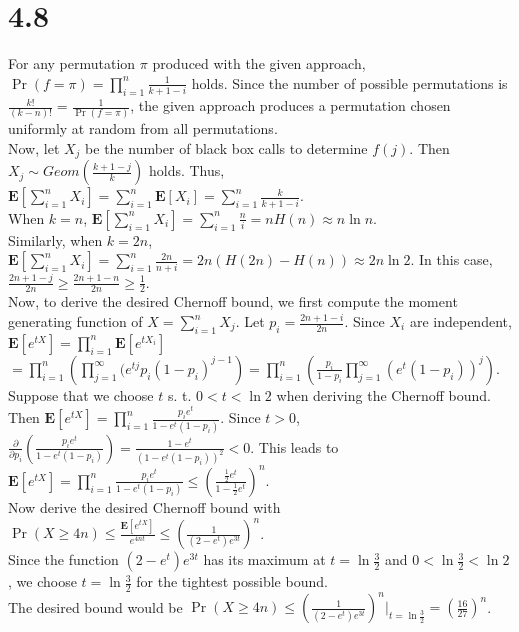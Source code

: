 \documentclass{article}
\begin{document}
\section*{4.8}
For any permutation $\pi$ produced with the given approach, $\Pr(f=\pi)=\prod\limits_{i=1}^n\frac{1}{k+1-i}$ holds.
Since the number of possible permutations is $\frac{k!}{(k-n)!}=\frac{1}{\Pr(f=\pi)}$,
the given approach produces a permutation chosen uniformly at random from all permutations.\\
Now, let $X_j$ be the number of black box calls to determine $f(j)$. Then $X_j\sim Geom(\frac{k+1-j}{k})$ holds.
Thus, $\textbf{E}[\sum\limits_{i=1}^nX_i]=\sum\limits_{i=1}^n\textbf{E}[X_i]=\sum\limits_{i=1}^n\frac{k}{k+1-i}$.\\
When $k=n$, $\textbf{E}[\sum\limits_{i=1}^nX_i]=\sum\limits_{i=1}^n\frac{n}{i}=nH(n)\approx n \ln n$.\\
Similarly, when $k=2n$, $\textbf{E}[\sum\limits_{i=1}^nX_i]=\sum\limits_{i=1}^n\frac{2n}{n+i}=2n(H(2n)-H(n))\approx2n\ln2$. In this case, $\frac{2n+1-j}{2n}\geq\frac{2n+1-n}{2n}\geq\frac{1}{2}$.\\
Now, to derive the desired Chernoff bound, we first compute the moment generating function of $X=\sum\limits_{i=1}^nX_j$.
Let $p_i=\frac{2n+1-i}{2n}$. Since $X_i$ are independent, $\textbf{E}[e^{tX}]=\prod\limits_{i=1}^n\textbf{E}[e^{tX_i}]$
$=\prod\limits_{i=1}^n\left(\prod\limits_{j=1}^\infty(e^{tj}p_i(1-p_i)^{j-1}\right)=\prod\limits_{i=1}^n\left(\frac{p_i}{1-p_i}\prod\limits_{j=1}^\infty(e^t(1-p_i))^j\right)$.\\
Suppose that we choose $t$ s. t. $0<t<\ln2$ when deriving the Chernoff bound.\\ Then $\textbf{E}[e^{tX}]=\prod\limits_{i=1}^n\frac{p_ie^t}{1-e^t(1-p_i)}$.
Since $t>0$, $\frac{\partial}{\partial p_i}\left(\frac{p_ie^t}{1-e^t(1-p_i)}\right)=\frac{1-e^t}{(1-e^t(1-p_i))^2}<0$.
This leads to $\textbf{E}[e^{tX}]=\prod\limits_{i=1}^n\frac{p_ie^t}{1-e^t(1-p_i)}\leq \left(\frac{\frac{1}{2}e^t}{1-\frac{1}{2}e^t}\right)^n$.\\
Now derive the desired Chernoff bound with $\Pr(X\geq 4n) \leq \frac{\textbf{E}[e^{tX}]}{e^{4nt}}\leq\left(\frac{1}{(2-e^t)e^{3t}}\right)^n$.\\
Since the function $(2-e^t)e^{3t}$ has its maximum at $t=\ln\frac{3}{2}$ and $0<\ln\frac{3}{2}<\ln2$, we choose $t=\ln\frac{3}{2}$ for the tightest possible bound.\\
The desired bound would be $\Pr(X\geq 4n) \leq \left(\frac{1}{(2-e^t)e^{3t}}\right)^n \Big|_{t=\ln\frac{3}{2}}=(\frac{16}{27})^n$.
\end{document}
